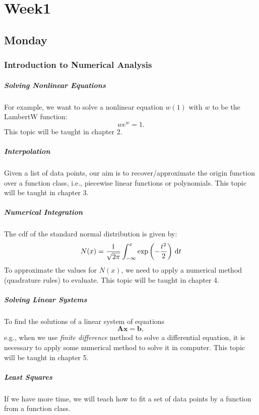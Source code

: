
\chapter{Week1}

\section{Monday}
\subsection{Introduction to Numerical Analysis}
\paragraph{Solving Nonlinear Equations}
For example, we want to solve a nonlinear equation $w(1)$ with $w$ to be the LambertW function:
\[
we^w = 1.
\]
This topic will be taught in chapter 2.

\paragraph{Interpolation}
Given a list of data points, our aim is to recover/approximate the origin function over a function class, i.e., piecewise linear functions or polynomials. This topic will be taught in chapter 3.

\paragraph{Numerical Integration}
The cdf of the standard normal distribution is given by:
\[
N(x)=\frac{1}{\sqrt{2\pi}}\int_{-\infty}^x\exp\left(-\frac{t^2}{2}\right)\,\mathrm{d} t
\]
To approximate the values for $N(x)$, we need to apply a numerical method (quadrature rules) to evaluate. This topic will be taught in chapter 4.

\paragraph{Solving Linear Systems}
To find the solutions of a linear system of equations 
\[
\bm{Ax}=\bm b,
\]
e.g., when we use \textit{finite difference} method to solve a differential equation, it is necessary to apply some numerical method to solve it in computer. This topic will be taught in chapter 5.

\paragraph{Least Squares}
If we have more time, we will teach how to fit a set of data points by a function from a function class.

